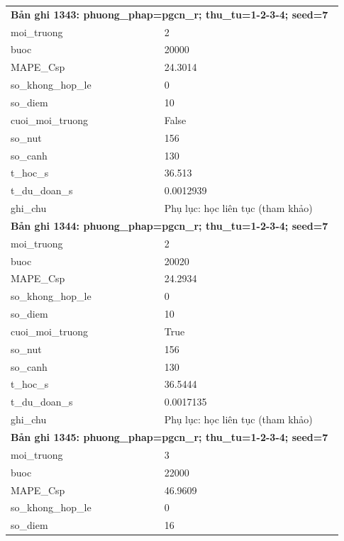 \begin{longtable}{p{0.43\linewidth}p{0.50\linewidth}}
\midrule
\multicolumn{2}{p{0.95\linewidth}}{\textbf{Bản ghi 1343: phuong\_phap=pgcn\_r; thu\_tu=1-2-3-4; seed=7}} \\
moi\_\allowbreak truong & 2 \\
buoc & 20000 \\
MAPE\_\allowbreak Csp & 24.3014 \\
so\_\allowbreak khong\_\allowbreak hop\_\allowbreak le & 0 \\
so\_\allowbreak diem & 10 \\
cuoi\_\allowbreak moi\_\allowbreak truong & False \\
so\_\allowbreak nut & 156 \\
so\_\allowbreak canh & 130 \\
t\_\allowbreak hoc\_\allowbreak s & 36.513 \\
t\_\allowbreak du\_\allowbreak doan\_\allowbreak s & 0.0012939 \\
ghi\_\allowbreak chu & Phụ lục: học liên tục (tham khảo) \\
\midrule
\multicolumn{2}{p{0.95\linewidth}}{\textbf{Bản ghi 1344: phuong\_phap=pgcn\_r; thu\_tu=1-2-3-4; seed=7}} \\
moi\_\allowbreak truong & 2 \\
buoc & 20020 \\
MAPE\_\allowbreak Csp & 24.2934 \\
so\_\allowbreak khong\_\allowbreak hop\_\allowbreak le & 0 \\
so\_\allowbreak diem & 10 \\
cuoi\_\allowbreak moi\_\allowbreak truong & True \\
so\_\allowbreak nut & 156 \\
so\_\allowbreak canh & 130 \\
t\_\allowbreak hoc\_\allowbreak s & 36.5444 \\
t\_\allowbreak du\_\allowbreak doan\_\allowbreak s & 0.0017135 \\
ghi\_\allowbreak chu & Phụ lục: học liên tục (tham khảo) \\
\midrule
\multicolumn{2}{p{0.95\linewidth}}{\textbf{Bản ghi 1345: phuong\_phap=pgcn\_r; thu\_tu=1-2-3-4; seed=7}} \\
moi\_\allowbreak truong & 3 \\
buoc & 22000 \\
MAPE\_\allowbreak Csp & 46.9609 \\
so\_\allowbreak khong\_\allowbreak hop\_\allowbreak le & 0 \\
so\_\allowbreak diem & 16 \\

\end{longtable}
